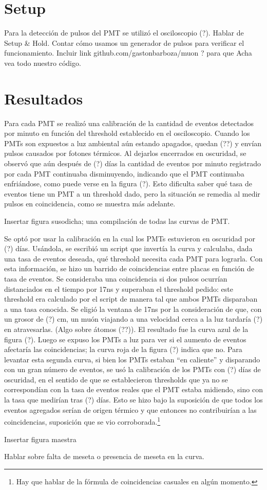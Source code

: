 \documentclass{article}
\begin{document}
\section*{Setup}

Para la detección de pulsos del PMT se utilizó el osciloscopio (?). Hablar de Setup \& Hold. Contar cómo usamos un generador de pulsos para verificar el funcionamiento. Incluir link github.com/gastonbarboza/muon ? para que Acha vea todo nuestro código.

\section*{Resultados}

Para cada PMT se realizó una calibración de la cantidad de eventos detectados por minuto en función del threshold establecido en el osciloscopio. Cuando los PMTs son expuestos a luz ambiental aún estando apagados, quedan (??) y envían pulsos causados por fotones térmicos. Al dejarlos encerrados en oscuridad, se observó que aún después de (?) días la cantidad de eventos por minuto registrado por cada PMT continuaba disminuyendo, indicando que el PMT continuaba enfriándose, como puede verse en la figura (?). Esto dificulta saber qué tasa de eventos tiene un PMT a un threshold dado, pero la situación se remedia al medir pulsos en coincidencia, como se muestra más adelante.

Insertar figura susodicha; una compilación de todas las curvas de PMT.

Se optó por usar la calibración en la cual los PMTs estuvieron en oscuridad por (?) días. Usándola, se escribió un script que invertía la curva y calculaba, dada una tasa de eventos deseada, qué threshold necesita cada PMT para lograrla. Con esta información, se hizo un barrido de coincidencias entre placas en función de tasa de eventos. Se consideraba una coincidencia si dos pulsos ocurrían distanciados en el tiempo por 17ns y superaban el threshold pedido: este threshold era calculado por el script de manera tal que ambos PMTs disparaban a una tasa conocida. Se eligió la ventana de 17ns por la consideración de que, con un grosor de (?) cm, un muón viajando a una velocidad cerca a la luz tardaría (?) en atravesarlas. (Algo sobre átomos (??)). El resultado fue la curva azul de la figura (?). Luego se expuso los PMTs a luz para ver si el aumento de eventos afectaría las coincidencias; la curva roja de la figura (?) indica que no. Para levantar esta segunda curva, si bien los PMTs estaban ``en caliente'' y disparando con un gran número de eventos, se usó la calibración de los PMTs con (?) días de oscuridad, en el sentido de que se establecieron thresholds que ya no se correspondían con la tasa de eventos reales que el PMT estaba midiendo, sino con la tasa que medirían tras (?) días. Esto se hizo bajo la suposición de que todos los eventos agregados serían de origen térmico y que entonces no contribuirían a las coincidencias, suposición que se vio corroborada.\footnote{Hay que hablar de la fórmula de coincidencias casuales en algún momento.}

Insertar figura maestra

Hablar sobre falta de meseta o presencia de meseta en la curva.
\end{document}
